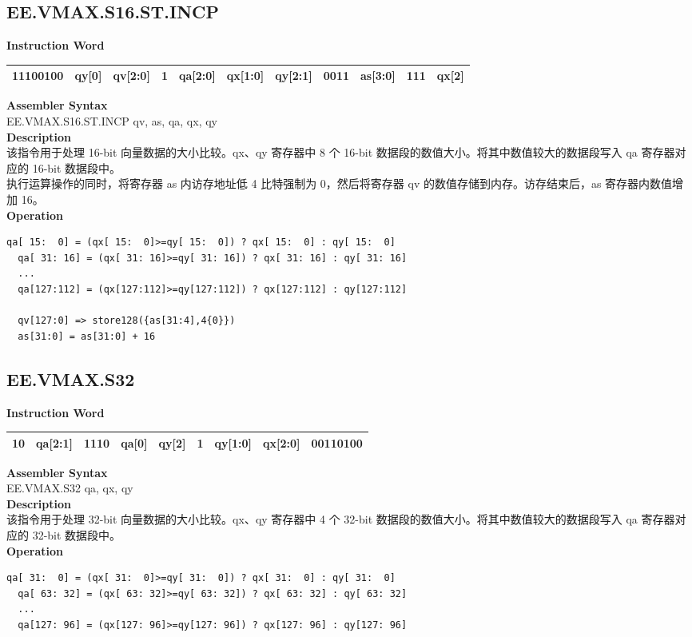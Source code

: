 \clearpage
\subsection{EE.VMAX.S16.ST.INCP}\label{instruction:EEVMAXS16STINCP}
\setlength\tabcolsep{6pt}
\textbf{Instruction Word} \\
\begin{tabular}{|c|c|c|c|c|c|c|c|c|c|c|}
	\hline
	11100100 & qy[0] & qv[2:0] & 1 & qa[2:0] & qx[1:0] & qy[2:1] & 0011 & as[3:0] & 111 & qx[2] \\
	\hline
\end{tabular}

\textbf{Assembler Syntax} \\
EE.VMAX.S16.ST.INCP qv, as, qa, qx, qy \\
\textbf{Description} \\
该指令用于处理 16-bit 向量数据的大小比较。qx、qy 寄存器中 8 个 16-bit 数据段的数值大小。将其中数值较大的数据段写入 qa 寄存器对应的 16-bit 数据段中。\\
执行运算操作的同时，将寄存器 as 内访存地址低 4 比特强制为 0，然后将寄存器 qv 的数值存储到内存。访存结束后，as 寄存器内数值增加 16。\\
\textbf{Operation}
\begin{lstlisting}[escapeinside=`?]
  qa[ 15:  0] = (qx[ 15:  0]>=qy[ 15:  0]) ? qx[ 15:  0] : qy[ 15:  0]
  qa[ 31: 16] = (qx[ 31: 16]>=qy[ 31: 16]) ? qx[ 31: 16] : qy[ 31: 16]
  ...
  qa[127:112] = (qx[127:112]>=qy[127:112]) ? qx[127:112] : qy[127:112]

  qv[127:0] => store128({as[31:4],4{0}})
  as[31:0] = as[31:0] + 16
\end{lstlisting}

\clearpage
\subsection{EE.VMAX.S32}\label{instruction:EEVMAXS32}
\setlength\tabcolsep{6pt}
\textbf{Instruction Word} \\
\begin{tabular}{|c|c|c|c|c|c|c|c|c|}
	\hline
	10 & qa[2:1] & 1110 & qa[0] & qy[2] & 1 & qy[1:0] & qx[2:0] & 00110100 \\
	\hline
\end{tabular}

\textbf{Assembler Syntax} \\
EE.VMAX.S32 qa, qx, qy \\
\textbf{Description} \\
该指令用于处理 32-bit 向量数据的大小比较。qx、qy 寄存器中 4 个 32-bit 数据段的数值大小。将其中数值较大的数据段写入 qa 寄存器对应的 32-bit 数据段中。\\
\textbf{Operation}
\begin{lstlisting}[escapeinside=`?]
  qa[ 31:  0] = (qx[ 31:  0]>=qy[ 31:  0]) ? qx[ 31:  0] : qy[ 31:  0]
  qa[ 63: 32] = (qx[ 63: 32]>=qy[ 63: 32]) ? qx[ 63: 32] : qy[ 63: 32]
  ...
  qa[127: 96] = (qx[127: 96]>=qy[127: 96]) ? qx[127: 96] : qy[127: 96]
\end{lstlisting}


